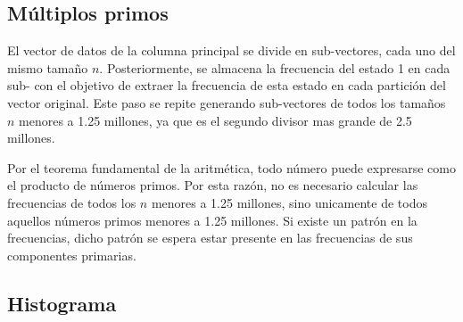\documentclass[12pt,twoside]{article}
\begin{document}
	\subsection{Múltiplos primos}
	
	El vector de datos de la columna principal se divide en sub-vectores, cada uno del mismo tamaño $n$. Posteriormente, se almacena la frecuencia del estado 1 en cada sub- con el objetivo de extraer la frecuencia de esta estado en cada partición del vector original. Este paso se repite generando sub-vectores de todos los tamaños $n$ menores a 1.25 millones, ya que es el segundo divisor mas grande de 2.5 millones.
	
	Por el teorema fundamental de la aritmética, todo número puede expresarse como el producto de números primos. Por esta razón, no es necesario calcular las frecuencias de todos los $n$ menores a 1.25 millones, sino unicamente de todos aquellos números primos menores a 1.25 millones. Si existe un patrón en la frecuencias, dicho patrón se espera estar presente  en las frecuencias de sus componentes primarias.
	
	\subsection{Histograma}
	
	
	
\end{document}
